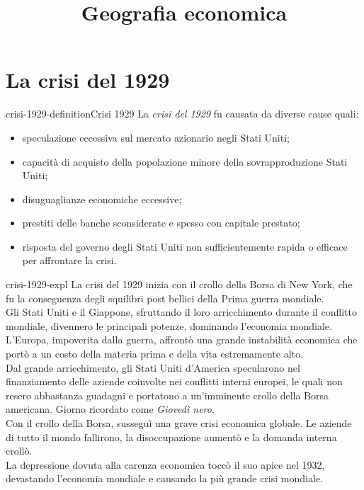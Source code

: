 \documentclass[preview]{standalone}
\begin{document}
\title{Geografia economica}
\genpage

\section{La crisi del 1929}

\begin{snippetdefinition}{crisi-1929-definition}{Crisi 1929}
    La \textit{crisi del 1929} fu causata da diverse cause quali:
    \begin{itemize}
        \item speculazione eccessiva sul mercato azionario negli Stati Uniti;
        \item capacità di acquisto della popolazione minore della sovrapproduzione Stati Uniti;
        \item disuguaglianze economiche eccessive;
        \item prestiti delle banche sconsiderate e spesso con capitale prestato;
        \item risposta del governo degli Stati Uniti non sufficientemente rapida o efficace per affrontare la crisi.
    \end{itemize}
\end{snippetdefinition}

\begin{snippet}{crisi-1929-expl}
    La crisi del 1929 inizia con il crollo della Borsa di New York, che fu la conseguenza degli
    squilibri post bellici della Prima guerra mondiale.
    \\
    Gli Stati Uniti e il Giappone, sfruttando il loro arricchimento durante il conflitto mondiale,
    divennero le principali potenze, dominando l'economia mondiale.
    \\
    L'Europa, impoverita dalla guerra, affrontò una grande instabilità economica che portò a un
    costo della materia prima e della vita estremamente alto.
    \\
    Dal grande arricchimento, gli Stati Uniti d'America specularono nel finanziamento delle aziende
    coinvolte nei conflitti interni europei, le quali non resero abbastanza guadagni e portatono a
    un'imminente crollo della Borsa americana. Giorno ricordato come \textit{Giovedì nero}.
    \\
    Con il crollo della Borsa, susseguì una grave crisi economica globale.
    Le aziende di tutto il mondo fallirono, la disoccupazione aumentò e la domanda interna crollò.
    \\
    La depressione dovuta alla carenza economica toccò il suo apice nel 1932, devastando l'economia
    mondiale e causando la più grande crisi mondiale.
\end{snippet}
\end{document}
